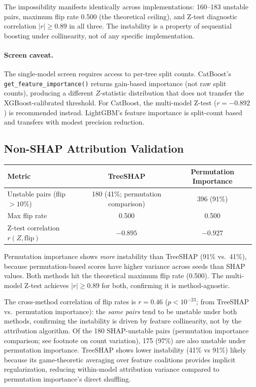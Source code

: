 \documentclass{article}
\begin{document}
The impossibility manifests identically across implementations: 160--183 unstable pairs, maximum flip rate 0.500 (the theoretical ceiling), and Z-test diagnostic correlation $|r| \geq 0.89$ in all three. The instability is a property of sequential boosting under collinearity, not of any specific implementation.

\paragraph{Screen caveat.}
\begin{sloppypar}
The single-model screen requires access to per-tree split counts.
CatBoost's \texttt{get\_feature\_importance()} returns gain-based importance
(not raw split counts), producing a different $Z$-statistic distribution that
does not transfer the XGBoost-calibrated threshold. For CatBoost, the multi-model
Z-test ($r = -0.892$) is recommended instead. LightGBM's feature
importance is split-count based and transfers with modest precision reduction.
\end{sloppypar}

\subsection{Non-SHAP Attribution Validation}

\begin{center}
\small
\begin{tabular}{@{}lcc@{}}
\toprule
Metric & TreeSHAP & Permutation Importance \\
\midrule
Unstable pairs (flip $>10\%$) & 180 (41\%; permutation comparison) & 396 (91\%) \\
Max flip rate & 0.500 & 0.500 \\
Z-test correlation $r(Z, \text{flip})$ & $-0.895$ & $-0.927$ \\
\bottomrule
\end{tabular}
\end{center}

Permutation importance shows \emph{more} instability than TreeSHAP (91\% vs.\ 41\%), because permutation-based scores have higher variance across seeds than SHAP values. Both methods hit the theoretical maximum flip rate (0.500). The multi-model Z-test achieves $|r| \geq 0.89$ for both, confirming it is method-agnostic.

The cross-method correlation of flip rates is $r = 0.46$ ($p < 10^{-23}$; from TreeSHAP vs.\ permutation importance): the \emph{same pairs} tend to be unstable under both methods, confirming the instability is driven by feature collinearity, not by the attribution algorithm. Of the 180 SHAP-unstable pairs (permutation importance comparison; see footnote on count variation), 175 (97\%) are also unstable under permutation importance. TreeSHAP shows lower instability (41\% vs 91\%) likely because its game-theoretic averaging over feature coalitions provides implicit regularization, reducing within-model attribution variance compared to permutation importance's direct shuffling.
\end{document}
